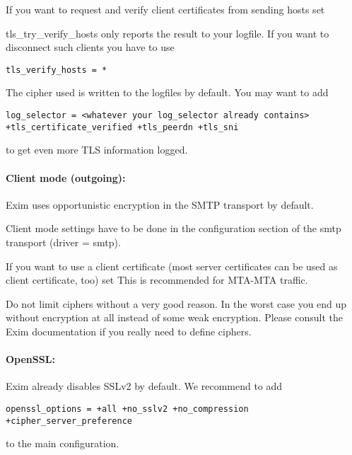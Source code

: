 If you want to request and verify client certificates from sending hosts set

tls\_try\_verify\_hosts only reports the result to your logfile. If you want to disconnect such clients you have to use
\begin{lstlisting}
tls_verify_hosts = *
\end{lstlisting}

The cipher used is written to the logfiles by default. You may want to add
\begin{lstlisting}
log_selector = <whatever your log_selector already contains> +tls_certificate_verified +tls_peerdn +tls_sni
\end{lstlisting}
to get even more TLS information logged.

\paragraph{Client mode (outgoing):}
Exim uses opportunistic encryption in the SMTP transport by default.

Client mode settings have to be done in the configuration section of the smtp transport (driver = smtp).

If you want to use a client certificate (most server certificates can be used as client certificate, too) set
This is recommended for MTA-MTA traffic.

Do not limit ciphers without a very good reason. In the worst case you end up without encryption at all instead of some weak encryption. Please consult the Exim documentation if you really need to define ciphers.

\paragraph{OpenSSL:}
Exim already disables SSLv2 by default. We recommend to add
\begin{lstlisting}
openssl_options = +all +no_sslv2 +no_compression +cipher_server_preference
\end{lstlisting}
to the main configuration.


